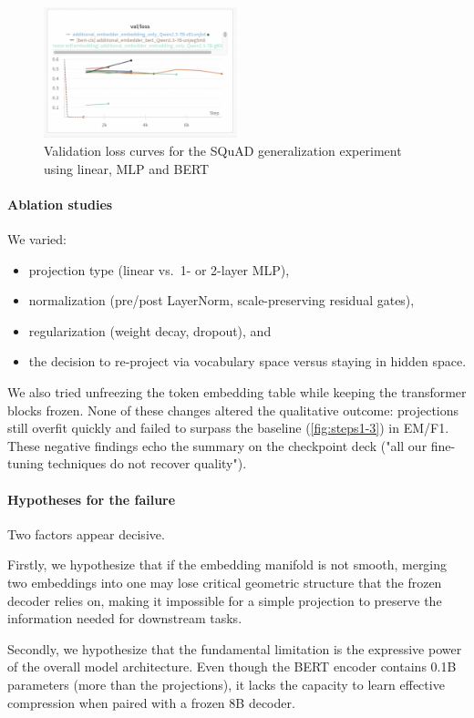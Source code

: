 \begin{figure}[hbt]
  \centering
  \includegraphics[width=0.5\textwidth]{graphs/losses_squad_1.jpg}
  \caption{Validation loss curves for the SQuAD generalization experiment using linear, MLP and BERT}
  \label{fig:losses_squad_1}
\end{figure}  


\paragraph{Ablation studies}
We varied:
\begin{itemize}
    \item projection type (linear vs.\ 1- or 2-layer MLP),
    \item normalization (pre/post LayerNorm, scale-preserving residual gates),
    \item regularization (weight decay, dropout), and
    \item the decision to re-project via vocabulary space versus staying in hidden space.
\end{itemize}
We also tried unfreezing the token embedding table while keeping the transformer blocks frozen.
None of these changes altered the qualitative outcome: projections still overfit quickly and failed to surpass the baseline (\ref{fig:steps1-3}) in EM/F1.
These negative findings echo the summary on the checkpoint deck ("all our fine-tuning techniques do not recover quality").

\paragraph{Hypotheses for the failure}
Two factors appear decisive.

Firstly, we hypothesize that if the embedding manifold is not smooth, merging two embeddings into one may lose critical geometric structure that the frozen decoder relies on, making it impossible for a simple projection to preserve the information needed for downstream tasks.


Secondly, we hypothesize that the fundamental limitation is the expressive power of the overall model architecture.
Even though the BERT encoder contains 0.1B parameters (more than the projections), it lacks the capacity to learn effective compression when paired with a frozen 8B decoder.

